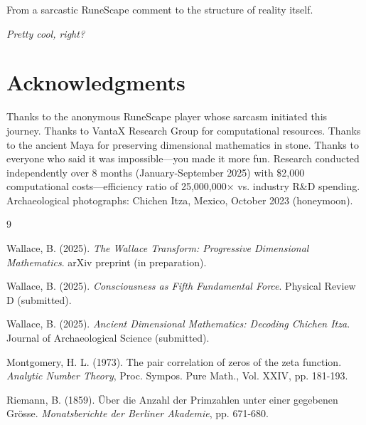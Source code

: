 \documentclass[12pt,twoside]{article}
\begin{document}
From a sarcastic RuneScape comment to the structure of reality itself.

\textit{Pretty cool, right?}

\section*{Acknowledgments}

Thanks to the anonymous RuneScape player whose sarcasm initiated this journey. Thanks to VantaX Research Group for computational resources. Thanks to the ancient Maya for preserving dimensional mathematics in stone. Thanks to everyone who said it was impossible—you made it more fun. Research conducted independently over 8 months (January-September 2025) with \$2,000 computational costs—efficiency ratio of 25,000,000× vs. industry R\&D spending. Archaeological photographs: Chichen Itza, Mexico, October 2023 (honeymoon).

\begin{thebibliography}{9}

Wallace, B. (2025).
\textit{The Wallace Transform: Progressive Dimensional Mathematics}.
arXiv preprint (in preparation).

Wallace, B. (2025).
\textit{Consciousness as Fifth Fundamental Force}. Physical Review D (submitted).

Wallace, B. (2025).
\textit{Ancient Dimensional Mathematics: Decoding Chichen Itza}. Journal of Archaeological Science (submitted).

Montgomery, H. L. (1973). The pair correlation of zeros of the zeta function.
\textit{Analytic Number Theory}, Proc. Sympos. Pure Math., Vol. XXIV, pp. 181-193.

Riemann, B. (1859). Über die Anzahl der Primzahlen unter einer gegebenen Grösse.
\textit{Monatsberichte der Berliner Akademie}, pp. 671-680.

\end{thebibliography}
\end{document}
